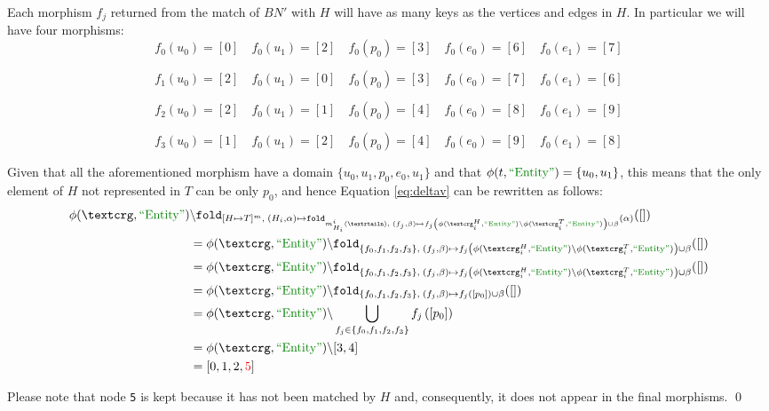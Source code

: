 \begin{example}[continues=ex:firstforgrammars,label=ex:firstforgrammars1]
	Each morphism $f_j$ returned from the match of $BN'$ with $H$ will have as many keys as the vertices and edges in $H$. In particular we will have four morphisms:
\[f_0(u_0)=[0]\quad f_0(u_1)=[2]\quad f_0(p_0)=[3]\quad f_0(e_0)=[6]\quad f_0(e_1)=[7]\]
	
\[f_1(u_0)=[2]\quad f_0(u_1)=[0]\quad f_0(p_0)=[3]\quad f_0(e_0)=[7]\quad f_0(e_1)=[6]\]

\[f_2(u_0)=[2]\quad f_0(u_1)=[1]\quad f_0(p_0)=[4]\quad f_0(e_0)=[8]\quad f_0(e_1)=[9]\]

\[f_3(u_0)=[1]\quad f_0(u_1)=[2]\quad f_0(p_0)=[4]\quad f_0(e_0)=[9]\quad f_0(e_1)=[8]\]
	
	
	
	Given that all the aforementioned morphism have a domain $\{u_0,u_1,p_0,e_0,u_1\}$ and that $\phi(t,\ONTA)=\{u_0,u_1\}$, this means that the only element of $H$ not represented in $T$
	can be only $p_0$, and hence Equation \ref{eq:deltav} can be rewritten as follows:
	\[\begin{split}
	\phi(\ngraph,\ONTA)&\backslash\texttt{fold}_{[H\mapsto T]^m,\;(H_i,\alpha)\mapsto \texttt{fold}_{m^i_{H_i}(\nested),\;(f_j,\beta)\mapsto f_j\left(\phi(\ngraph_i^H,\ONTA)\backslash\phi(\ngraph_i^T,\ONTA)\right)\cup\beta }(\alpha)}([])\\
	&=\phi(\ngraph,\ONTA)\backslash\texttt{fold}_{\{f_0,f_1,f_2,f_3\},\;(f_j,\beta)\mapsto f_j\left(\phi(\ngraph_i^H,\ONTA)\backslash\phi(\ngraph_i^T,\ONTA)\right)\cup\beta }([])\\
	&=\phi(\ngraph,\ONTA)\backslash\texttt{fold}_{\{f_0,f_1,f_2,f_3\},\;(f_j,\beta)\mapsto f_j\left(\phi(\ngraph_i^H,\ONTA)\backslash\phi(\ngraph_i^T,\ONTA)\right)\cup\beta }([])\\
	&=\phi(\ngraph,\ONTA)\backslash\texttt{fold}_{\{f_0,f_1,f_2,f_3\},\;(f_j,\beta)\mapsto f_j\left([p_0]\right)\cup\beta }([])\\	
	&=\phi(\ngraph,\ONTA)\backslash\bigcup_{f_j\in \{f_0,f_1,f_2,f_3\}} f_j\left([p_0]\right) \\
	&=\phi(\ngraph,\ONTA)\backslash[3,4] \\
	&=[0,1,2,{\color{red}5}]
	\end{split}\]

Please note that node \texttt{\color{red}5} is kept because it has not been matched by $H$ and, consequently, it does not appear in the final morphisms.
	\qed
\end{example}

